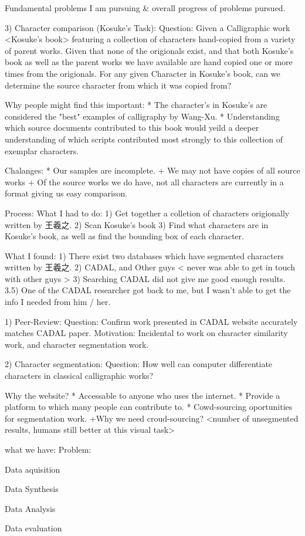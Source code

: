 Fundamental problems I am pursuing & overall progress of problems pursued.



3)  Character comparison (Kosuke's Task):
    Question:   Given a Calligraphic work <Kosuke's book> featuring a collection of characters hand-copied from a variety of parent works.
                Given that none of the origionals exist, and that both Kosuke's book as well as the parent works we have available are hand copied one or more times from the origionals.
                For any given Character in Kosuke's book, can we determine the source character from which it was copied from?
                






Why people might find this important:
    *  The character's in Kosuke's are considered the "best" examples of calligraphy by Wang-Xu.
    *  Understanding which source documents contributed to this book would yeild a deeper understanding of which scripts contributed most strongly to this collection of exemplar characters.
    
Chalanges:
    *  Our samples are incomplete.
        + We may not have copies of all source works
        + Of the source works we do have, not all characters are currently in a format giving us easy comparison.


Process:  What I had to do:
    1)  Get together a colletion of characters origionally written by 王羲之.
    2)  Scan Kosuke's book
    3)  Find what characters are in Kosuke's book, as well as find the bounding box of each character.
    
What I found:
    1)  There exist two databases which have segmented characters written by 王羲之.
    2)  CADAL, and Other guys < never was able to get in touch with other guys >
    3)  Searching CADAL did not give me good enough results.
    3.5)  One of the CADAL researcher got back to me, but I wasn't able to get the info I needed from him / her.


1)  Peer-Review:
    Question:  Confirm work presented in CADAL website accurately matches CADAL paper.
    Motivation:  Incidental to work on character similarity work, and character segmentation work.



2)  Character segmentation:
    Question:  How well can computer differentiate characters in classical calligraphic works?
    
Why the website?
    * Accessable to anyone who uses the internet.
    * Provide  a platform to which many people can contribute to.
    * Cowd-sourcing oportunities for segmentation work.
        +Why we need croud-sourcing? <number of unsegmented results, humans still better at this visual task>




what we have:
    Problem:
    
    Data aquisition
    
    Data Synthesis
    
    Data Analysis
    
    Data evaluation
